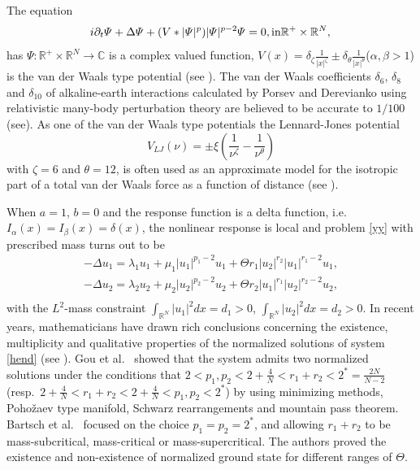 \documentclass[10pt,a4paper]{amsart}
\numberwithin{equation}{section}
\begin{document}
The equation
\begin{equation}\label{yyu5}
 i\partial_t\varPsi+\Delta \varPsi+(V\ast|\varPsi|^p)|\varPsi|^{p-2}\varPsi=0,    \text{in} \mathbb{R}^+\times\mathbb{R}^N,\\
 \end{equation}
has $\varPsi:\mathbb{R}^+\times\mathbb{R}^N\to \mathbb{C}$ is a complex
valued function, $V(x)=\delta_{\zeta}\frac{1}{|x|^\zeta}\pm
 \delta_{\theta}\frac{1}{|x|^\theta}$($\alpha,\beta>1$)
is the van der Waals type potential (see \cite{VWp3,BZd27}).
The van der Waals coefficients
$\delta_6$, $\delta_8$ and $\delta_{10}$ of alkaline-earth interactions
calculated by Porsev and Derevianko using relativistic many-body perturbation
theory are believed to be accurate to $1/100$ (see\cite{cfrv}).
As one of the van der Waals type potentials the Lennard-Jones potential
\[
 V_{LJ}(\nu)=\pm\xi(\frac{1}{\nu^\zeta }-\frac{1}{\nu^\theta})
\]
with $\zeta =6$ and $\theta=12$, is often used as an approximate model for the
isotropic part of a total van der
 Waals force as a function of distance (see \cite{VWp3,BZd27}).

When $a=1$, $b=0$ and the response function is a delta function, i.e.\
$I_\alpha(x)=I_\beta(x)=\delta(x)$, the nonlinear response is local and
problem \eqref{yy} with
prescribed mass turns out to be
\begin{equation}\label{hend}
\begin{gathered}
-\Delta u_1=\lambda_1 u_1+\mu_1|u_1|^{p_1-2}u_1+
 \Theta r_1|u_2|^{r_2}|u_1|^{r_1-2}u_1, \\
-\Delta u_2=\lambda_2 u_2+\mu_2|u_2|^{p_2-2}u_2+
 \Theta r_2|u_1|^{r_1}|u_2|^{r_2-2}u_2, \\
\end{gathered}
\end{equation}
with the $L^2$-mass constraint
$\int_{\mathbb{R}^N}|u_1|^2dx=d_1>0$, $\int_{\mathbb{R}^N}|u_2|^2dx=d_2>0$.
In recent years, mathematicians have drawn rich conclusions
concerning the existence, multiplicity and qualitative properties of
the normalized solutions of system \eqref{hend}
(see \cite{Huij1,Huij2,Huij3,Huij4,Huij5,Huij6}).
Gou et al.\ \cite{Huij6} showed that
the system admits two normalized solutions under the conditions that
$2<p_1,p_2<2+\frac{4}{N}<r_1+r_2<2^*=\frac{2N}{N-2}$
(resp.\ $2+\frac{4}{N}<r_1+r_2<2+\frac{4}{N}<p_1,p_2<2^*$)
by using minimizing methods, Poho\v{z}aev type manifold, Schwarz rearrangements
and mountain pass theorem.
Bartsch et al.\ \cite{Huij4} focused on the choice $p_1=p_2=2^*$, and allowing
$r_1+r_2$ to be mass-subcritical, mass-critical or mass-supercritical.
The authors proved the existence and non-existence of normalized ground state for
different ranges of $\Theta$.
\end{document}
